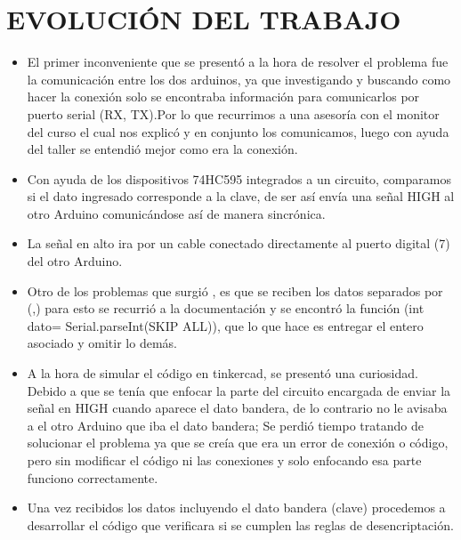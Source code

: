\documentclass{article}
\begin{document}
\section{EVOLUCIÓN DEL TRABAJO}
\label{evolucion}
\begin{itemize}
\item El primer inconveniente que se presentó a la hora de resolver el problema fue la comunicación entre los dos arduinos, ya que investigando y buscando como hacer la conexión solo se encontraba información para comunicarlos por puerto serial (RX, TX).Por lo que recurrimos a una asesoría con el monitor del curso el cual nos explicó y en conjunto los comunicamos, luego con ayuda del taller se entendió mejor como era la conexión.

\item Con ayuda de los dispositivos 74HC595 integrados a un circuito, comparamos si el dato ingresado corresponde a la clave, de ser así envía una señal HIGH al otro Arduino comunicándose así de manera sincrónica.

\item La señal en alto ira por un cable conectado directamente al puerto digital (7) del otro Arduino.

\item Otro de los problemas que surgió , es que se reciben los datos separados por (,) para esto se recurrió a la documentación y se encontró la función (int dato= Serial.parseInt(SKIP ALL)), que lo que hace es entregar el entero asociado y omitir lo demás.

\item A la hora de simular el código en tinkercad, se presentó una curiosidad. Debido a que se tenía que enfocar la parte del circuito encargada de enviar la señal en HIGH cuando aparece el dato bandera, de lo contrario no le avisaba a el otro Arduino que iba el dato bandera; Se perdió tiempo  tratando de solucionar el problema ya que se creía que era un error de conexión o código, pero sin modificar el código ni las conexiones y solo enfocando esa parte funciono correctamente.

\item Una vez recibidos los datos incluyendo el dato bandera (clave) procedemos a desarrollar el código que verificara si se cumplen las reglas de desencriptación.



\end{itemize}
\end{document}
